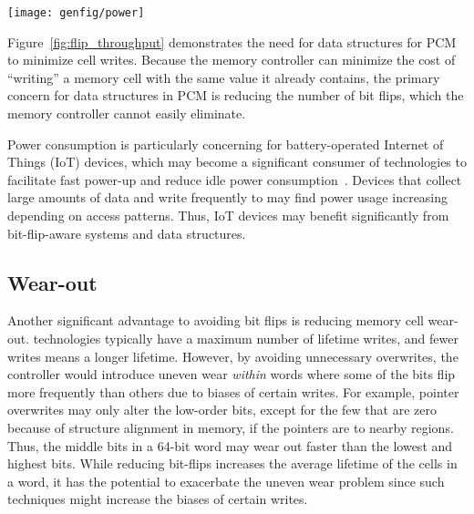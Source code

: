 \begin{SCfigure}
	\centering
	\texttt{[image: genfig/power]}
	\caption{Power use as a function of flips per second~\cite{bittman:nvmsa18}.}
	\label{fig:flip_throughput}
\end{SCfigure}

Figure~\ref{fig:flip_throughput} demonstrates the need for data structures for
PCM to minimize cell writes.  Because the memory controller can minimize the
cost of ``writing'' a memory cell with the same value it already contains, the
primary concern for data structures in PCM is reducing the number of bit flips,
which the memory controller cannot easily eliminate.

Power consumption is particularly concerning for battery-operated Internet of Things (IoT) devices,
which may become a significant consumer of \NVM technologies to facilitate fast power-up and reduce
idle power consumption~\cite{Jayakumar2014powering,jayakumar2014quickrecall}. Devices that collect
large amounts of data and write frequently to \NVM may find power usage
increasing depending on access patterns. Thus, IoT devices may benefit significantly
from bit-flip-aware systems and data structures.


\subsection{Wear-out}

Another significant advantage to avoiding bit flips is reducing memory cell
wear-out. \NVM technologies typically have a maximum number of lifetime writes,
and fewer writes means a longer lifetime. However, by avoiding unnecessary overwrites,
the controller would introduce uneven wear \emph{within} \NVM words where some of the bits flip
more frequently than others due to biases of certain writes.
For example, pointer overwrites may only alter the low-order bits, except
for the few that are zero because of structure alignment in memory, if the
pointers are to nearby regions. Thus, the middle bits in a 64-bit word may
wear out faster than the lowest and highest bits. While reducing bit-flips increases the
average lifetime of the cells in a word, it has the potential to exacerbate the uneven wear
problem since such techniques might increase the biases of certain writes.


